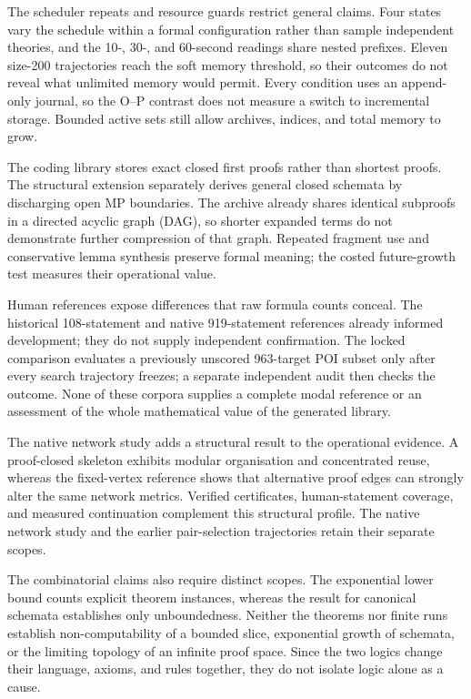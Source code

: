 \documentclass[pdflatex,sn-basic,Numbered]{sn-jnl}
\begin{document}
The scheduler repeats and resource guards restrict general claims. Four states vary the schedule within a formal configuration rather than sample independent theories, and the 10-, 30-, and 60-second readings share nested prefixes. Eleven size-200 trajectories reach the soft memory threshold, so their outcomes do not reveal what unlimited memory would permit. Every condition uses an append-only journal, so the O--P contrast does not measure a switch to incremental storage. Bounded active sets still allow archives, indices, and total memory to grow.

The coding library stores exact closed first proofs rather than shortest proofs. The structural extension separately derives general closed schemata by discharging open MP boundaries. The archive already shares identical subproofs in a directed acyclic graph (DAG), so shorter expanded terms do not demonstrate further compression of that graph. Repeated fragment use and conservative lemma synthesis preserve formal meaning; the costed future-growth test measures their operational value.

Human references expose differences that raw formula counts conceal. The historical 108-statement and native 919-statement references already informed development; they do not supply independent confirmation. The locked comparison evaluates a previously unscored 963-target POI subset only after every search trajectory freezes; a separate independent audit then checks the outcome. None of these corpora supplies a complete modal reference or an assessment of the whole mathematical value of the generated library.

The native network study adds a structural result to the operational evidence. A proof-closed skeleton exhibits modular organisation and concentrated reuse, whereas the fixed-vertex reference shows that alternative proof edges can strongly alter the same network metrics. Verified certificates, human-statement coverage, and measured continuation complement this structural profile. The native network study and the earlier pair-selection trajectories retain their separate scopes.

The combinatorial claims also require distinct scopes. The exponential lower bound counts explicit theorem instances, whereas the result for canonical schemata establishes only unboundedness. Neither the theorems nor finite runs establish non-computability of a bounded slice, exponential growth of schemata, or the limiting topology of an infinite proof space. Since the two logics change their language, axioms, and rules together, they do not isolate logic alone as a cause.
\end{document}
